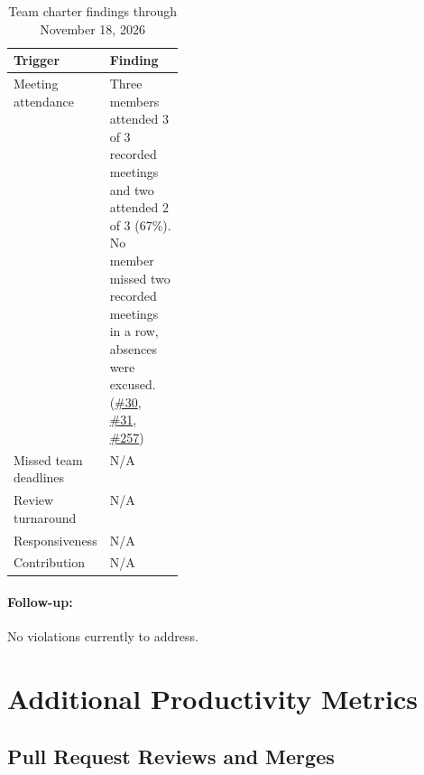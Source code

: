 \documentclass{article}
\begin{document}
\begin{table}[H]
\caption{Team charter findings through November 18, 2026}
\centering
\begin{tabularx}{\linewidth}{@{}>{\raggedright\arraybackslash}p{0.22\linewidth}
  >{\raggedright\arraybackslash}X@{}}
\toprule
\textbf{Trigger} & \textbf{Finding}\\
\midrule
Meeting attendance &
  Three members attended 3 of 3 recorded meetings and two attended 2 of 3
  (67\%). No member missed two recorded meetings in a row, absences were excused.
  (\href{https://github.com/davislenover/BurnNEarn/issues/30}{\#30},
  \href{https://github.com/davislenover/BurnNEarn/issues/31}{\#31},
  \href{https://github.com/davislenover/BurnNEarn/issues/257}{\#257})\\
\addlinespace
Missed team deadlines & N/A\\
\addlinespace
Review turnaround & N/A\\
\addlinespace
Responsiveness & N/A\\
\addlinespace
Contribution & N/A\\
\bottomrule
\end{tabularx}
\end{table}

\paragraph{Follow-up:}
No violations currently to address.

\section{Additional Productivity Metrics}




\subsection{Pull Request Reviews and Merges}
\end{document}
